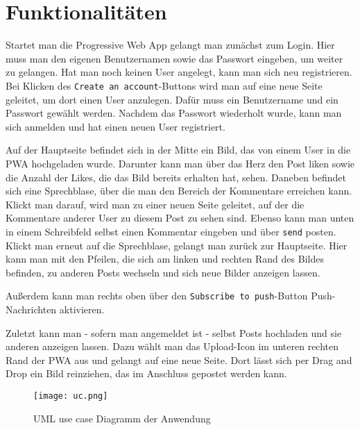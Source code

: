 \chapter{Funktionalitäten}

Startet man die Progressive Web App gelangt man zunächst zum Login. Hier muss man den eigenen Benutzernamen sowie das Passwort eingeben, um weiter zu gelangen. Hat man noch keinen User angelegt, kann man sich neu registrieren. Bei Klicken des \texttt{Create an account}-Buttons wird man auf eine neue Seite geleitet, um dort einen User anzulegen. Dafür muss ein Benutzername und ein Passwort gewählt werden. Nachdem das Passwort wiederholt wurde, kann man sich anmelden und hat einen neuen User registriert.

Auf der Hauptseite befindet sich in der Mitte ein Bild, das von einem User in die PWA hochgeladen wurde. Darunter kann man über das Herz den Post liken sowie die Anzahl der Likes, die das Bild bereits erhalten hat, sehen. Daneben befindet sich eine Sprechblase, über die man den Bereich der Kommentare erreichen kann. Klickt man darauf, wird man zu einer neuen Seite geleitet, auf der die Kommentare anderer User zu diesem Post zu sehen sind. Ebenso kann man unten in einem Schreibfeld selbst einen Kommentar eingeben und über \texttt{send} posten. Klickt man erneut auf die Sprechblase, gelangt man zurück zur Hauptseite. Hier kann man mit den Pfeilen, die sich am linken und rechten Rand des Bildes befinden, zu anderen Posts wechseln und sich neue Bilder anzeigen lassen.

Außerdem kann man rechts oben über den \texttt{Subscribe to push}-Button Push-Nachrichten aktivieren. 

Zuletzt kann man - sofern man angemeldet ist - selbst Posts hochladen und sie anderen anzeigen lassen. Dazu wählt man das Upload-Icon im unteren rechten Rand der PWA aus und gelangt auf eine neue Seite. Dort lässt sich per Drag and Drop ein Bild reinziehen, das im Anschluss gepostet werden kann. 

\begin{figure}
    \centering
    \texttt{[image: uc.png]}
    \caption{UML use case Diagramm der Anwendung}
    \label{img:uc}
\end{figure}